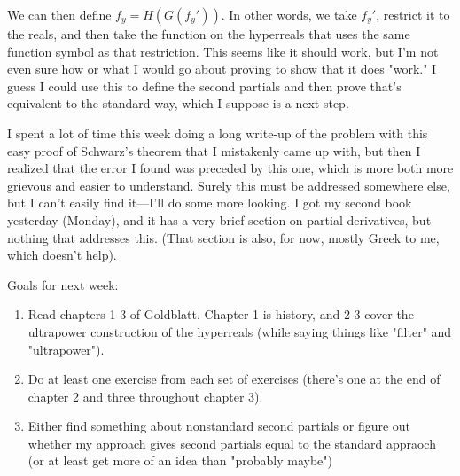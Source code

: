 \documentclass{article}
\begin{document}
We can then define $f_y = H(G(f_y'))$. In other words, we take $f_y'$, restrict it to the reals, and then take the function on the hyperreals that uses the same function symbol as that restriction. This seems like it should work, but I'm not even sure how or what I would go about proving to show that it does "work." I guess I could use this to define the second partials and then prove that's equivalent to the standard way, which I suppose is a next step.

I spent a lot of time this week doing a long write-up of the problem with this easy proof of Schwarz's theorem that I mistakenly came up with, but then I realized that the error I found was preceded by this one, which is more both more grievous and easier to understand. Surely this must be addressed somewhere else, but I can't easily find it---I'll do some more looking. I got my second book yesterday (Monday), and it has a very brief section on partial derivatives, but nothing that addresses this. (That section is also, for now, mostly Greek to me, which doesn't help).

Goals for next week:
\begin{enumerate}
    \item Read chapters 1-3 of Goldblatt. Chapter 1 is history, and 2-3 cover the ultrapower construction of the hyperreals (while saying things like "filter" and "ultrapower").
    \item Do at least one exercise from each set of exercises (there's one at the end of chapter 2 and three throughout chapter 3).
    \item Either find something about nonstandard second partials or figure out whether my approach gives second partials equal to the standard appraoch (or at least get more of an idea than "probably maybe")
\end{enumerate}
\end{document}
